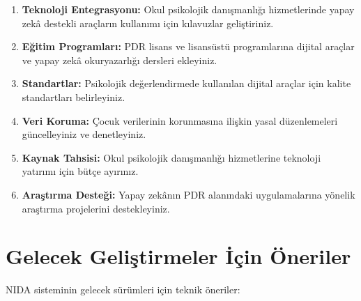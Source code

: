 \begin{enumerate}
  \item \textbf{Teknoloji Entegrasyonu:} Okul psikolojik danışmanlığı hizmetlerinde yapay zekâ destekli araçların kullanımı için kılavuzlar geliştiriniz.

  \item \textbf{Eğitim Programları:} PDR lisans ve lisansüstü programlarına dijital araçlar ve yapay zekâ okuryazarlığı dersleri ekleyiniz.

  \item \textbf{Standartlar:} Psikolojik değerlendirmede kullanılan dijital araçlar için kalite standartları belirleyiniz.

  \item \textbf{Veri Koruma:} Çocuk verilerinin korunmasına ilişkin yasal düzenlemeleri güncelleyiniz ve denetleyiniz.

  \item \textbf{Kaynak Tahsisi:} Okul psikolojik danışmanlığı hizmetlerine teknoloji yatırımı için bütçe ayırınız.

  \item \textbf{Araştırma Desteği:} Yapay zekânın PDR alanındaki uygulamalarına yönelik araştırma projelerini destekleyiniz.
\end{enumerate}

\section{Gelecek Geliştirmeler İçin Öneriler}

NIDA sisteminin gelecek sürümleri için teknik öneriler:

